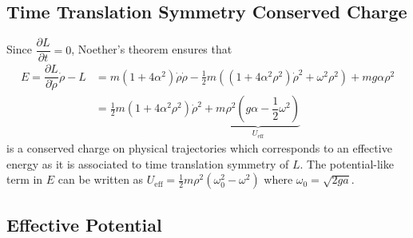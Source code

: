 \documentclass[12pt, a4paper]{article}
\begin{document}
%
\subsection{Time Translation Symmetry Conserved Charge}
Since $\dfrac{\partial L}{\partial t} = 0$, Noether's theorem ensures that 
\begin{align*}
     E = \dfrac{\partial L}{\partial \dot{\rho}}
      \dot{\rho}-L &= m \left(1  + 4\alpha^2 \right) \dot{\rho}\dot{\rho} - \frac{1}{2}m \left(\left(1 + 4\alpha^2 \rho^2\right) \dot{\rho}^2  + \omega^2\rho^2 \right) + mg \alpha \rho^2 \\ &= \frac{1}{2}m\left(1 + 4\alpha^2 \rho^2\right) \dot{\rho}^2 + \underbrace{m \rho^2 \left(g \alpha - \dfrac{1}{2} \omega^2\right)}_{U_\text{eff}} 
\end{align*}
is a conserved charge on physical trajectories which corresponds to an effective energy as it is associated to time translation symmetry of $L$. The potential-like term in $E$ can be written as  $U_\text{eff} = \frac{1}{2}m \rho^2 (\omega_0^2-\omega^2)$ where $\omega_0 = \sqrt{2ga}$.
\subsection{Effective Potential}
\end{document}
